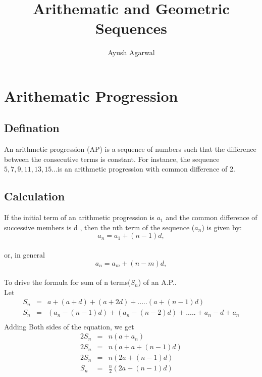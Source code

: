 \documentclass[a4paper,10pt]{article}
\title{Arithematic and Geometric Sequences}
\author{Ayush Agarwal}
\date{}
\begin{document}
\maketitle


\section*{Arithematic Progression}
\subsection*{Defination}
An arithmetic progression (AP) is a sequence of numbers such that the difference between the consecutive terms is constant. 
For instance, the sequence $5, 7, 9, 11, 13, 15 … $is an arithmetic progression with common difference of 2.\\

\subsection*{Calculation}
If the initial term of an arithmetic progression is $a_1$ and the common difference of successive members is d
, then the nth term of the sequence ($a_n$) is given by:\\
\vspace{2mm}
 $$a_n = a_1 + (n - 1)d,$$\\
 or, in general
 $$a_n = a_m + (n - m)d,$$\\
To drive the formula for sum of n terms($S_n$) of an A.P..\\
Let \\
\begin{eqnarray*}
S_n&=& a + (a + d) + (a + 2d) + ..... (a + (n - 1)d)\\
S_n&=&(a_n - (n - 1)d) + (a_n - (n - 2)d) + ..... + a_n - d + a_n\\
\end{eqnarray*}
\textrm Adding Both sides of the equation, we get\\
\begin{eqnarray*}
2S_n&=& n(a + a_n)\\
2S_n&=& n(a + a + (n - 1)d) \\
2S_n&=& n(2a + (n - 1)d) \\
S_n&=& \frac{n}{2}(2a + (n - 1)d) \\
\end{eqnarray*} 
\end{document}
